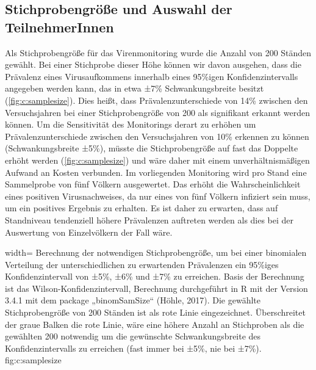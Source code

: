 

\subsection{Stichprobengröße und Auswahl der TeilnehmerInnen} \label{chap:auswahl}

Als Stichprobengröße für das Virenmonitoring wurde die Anzahl von 200 Ständen gewählt. Bei einer Stichprobe dieser Höhe können wir davon ausgehen, dass die Prävalenz eines Virusaufkommens innerhalb eines 95\%igen Konfidenzintervalls angegeben werden kann, das in etwa ±7\% Schwankungsbreite besitzt (\cref{fig:c:samplesize}). Dies heißt, dass Prävalenzunterschiede von 14\% zwischen den Versuchsjahren bei einer Stichprobengröße von 200 als signifikant erkannt werden können. Um die Sensitivität des Monitorings derart zu erhöhen um Prävalenzunterschiede zwischen den Versuchsjahren von 10\% erkennen zu können (Schwankungsbreite ±5\%), müsste die Stichprobengröße auf fast das Doppelte erhöht werden (\cref{fig:c:samplesize}) und wäre daher mit einem unverhältnismäßigen Aufwand an Kosten verbunden. Im vorliegenden Monitoring wird pro Stand eine Sammelprobe von fünf Völkern ausgewertet. Das erhöht die Wahrscheinlichkeit eines positiven Virusnachweises, da nur eines von fünf Völkern infiziert sein muss, um ein positives Ergebnis zu erhalten. Es ist daher zu erwarten, dass auf Standniveau tendenziell höhere Prävalenzen auftreten werden als dies bei der Auswertung von Einzelvölkern der Fall wäre.

  {width=\textwidth} %
  {Berechnung der notwendigen Stichprobengröße, um bei einer binomialen Verteilung der unterschiedlichen zu erwartenden Prävalenzen ein 95\%iges Konfidenzintervall von ±5\%, ±6\% und ±7\% zu erreichen. Basis der Berechnung ist das Wilson-Konfidenzintervall, Berechnung durchgeführt in R mit der Version 3.4.1 \citep{rcoreteam2020} mit dem package „binomSamSize“ (Höhle, 2017). Die gewählte Stichprobengröße von 200 Ständen ist als rote Linie eingezeichnet. Überschreitet der graue Balken die rote Linie, wäre eine höhere Anzahl an Stichproben als die gewählten 200 notwendig um die gewünschte Schwankungsbreite des Konfidenzintervalls zu erreichen (fast immer bei ±5\%, nie bei ±7\%).} %
  {} %
  {fig:c:samplesize} %

